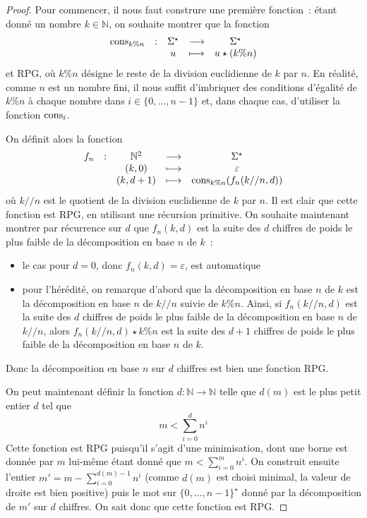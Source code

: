 \begin{proof}
  Pour commencer, il nous faut construre une première fonction~: étant donné un
  nombre $k \in \mathbb N$, on souhaite montrer que la fonction
  \[\begin{array}{ccccc}
  \operatorname{cons}_{k\% n} &: & \Sigma^\star & \longrightarrow & \Sigma^\star\\
  & & u &\longmapsto & u\star (k\% n)
  \end{array}\]
  et RPG, où $k \% n$ désigne le reste de la division euclidienne de $k$ par
  $n$. En réalité, comme $n$ est un nombre fini, il nous suffit d'imbriquer des
  conditions d'égalité de $k \% n$ à chaque nombre dans $i\in\{0,\ldots,n-1\}$
  et, dans chaque cas, d'utiliser la fonction $\operatorname{cons}_i$.

  On définit alors la fonction
  \[\begin{array}{ccccc}
  f_n &: & \mathbb N^2 &\longrightarrow & \Sigma^\star\\
  & & (k,0) & \longmapsto & \varepsilon\\
  & & (k,d + 1) & \longmapsto & \operatorname{cons}_{k\% n}(f_n(k//n,d))
  \end{array}\]
  où $k//n$ est le quotient de la division euclidienne de $k$ par $n$. Il est
  clair que cette fonction est RPG, en utilisant une récursion primitive. On
  souhaite maintenant montrer par récurrence sur $d$ que
  $f_n(k,d)$ est la suite des $d$ chiffres de poids le plus faible de la
  décomposition en base $n$ de $k$~:
  \begin{itemize}
  \item le cas pour $d = 0$, donc $f_n(k,d) = \varepsilon$, est automatique
  \item pour l'hérédité, on remarque d'abord que la décomposition en base
    $n$ de $k$ est la décomposition en base $n$ de $k//n$ suivie de
    $k \% n$. Ainsi, si $f_n(k//n,d)$ est la suite des $d$ chiffres de poids le
    plus faible de la décomposition en base $n$ de $k//n$, alors
    $f_n(k//n,d)\star k\%n$ est la suite des $d + 1$ chiffres de poids le plus
    faible de la décomposition en base $n$ de $k$.
  \end{itemize}
  Donc la décomposition en base $n$ sur $d$ chiffres est bien une fonction RPG.

  On peut maintenant définir la fonction $d : \mathbb N \to \mathbb N$ telle que
  $d(m)$ est le plus petit entier $d$ tel que
  \[m < \sum_{i = 0}^d n^i\]
  Cette fonction est RPG puisqu'il s'agit d'une minimisation, dont une borne
  est donnée par $m$ lui-même étant donné que $m < \sum_{i = 0}^m n^i$.
  On construit ensuite l'entier $m' = m - \sum_{i = 0}^{d(m)-1} n^i$ (comme $d(m)$
  est choisi minimal, la valeur de droite est bien positive) puis le
  mot sur $\{0,\ldots,n-1\}^\star$ donné par la décomposition de $m'$ sur
  $d$ chiffres. On sait donc que cette fonction est RPG.


\end{proof}
